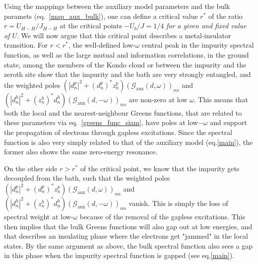 \documentclass{report}
\numberwithin{equation}{section}
\begin{document}
\begin{itemize}
Using the mappings between the auxiliary model parameters and the bulk paramets (eq.~\ref{map_aux_bulk}), one can define a critical value \(r^{*}\) of the ratio \(r = U_{H-H}/J_{H-H}\) at the critical points \(-U_b/J=1/4\) \textit{for a given and fixed value of \(U\)}. We will now argue that this critical point describes a metal-insulator transition. For \(r < r^{*}\), the well-defined low-\(\omega\) central peak in the impurity spectral function, as well as the large mutual and information correlations, in the ground state, among the members of the Kondo cloud or between the impurity and the zeroth site show that the impurity and the bath are very strongly entangled, and the weighted poles \(\left(|d^p_n|^2 + \left(d^p_n\right)^* z^p_n\right) \left(\mathcal{G}_\text{aux}(d, \omega)\right)_{nn}\) and \(\left(|d^h_n|^2 + \left(z^h_n\right)^* d^h_n\right)\left(\mathcal{G}_\text{aux}(d, -\omega)\right)_{nn}\) are non-zero at low \(\omega\). This means that both the local and the nearest-neighbour Greens functions, that are related to these parameters via eq.~\ref{greens_func_siam}, have poles at low\(-\omega\) and support the propagation of electrons through gapless excitations. Since the spectral function is also very simply related to that of the auxiliary model (eq.\eqref{main}), the former also shows the same zero-energy resonance.

On the other side \(r > r^{*}\) of the critical point, we know that the impurity gets decoupled from the bath, such that the weighted poles \(\left(|d^p_n|^2 + \left(d^p_n\right)^* z^p_n\right) \left(\mathcal{G}_\text{aux}(d, \omega)\right)_{nn}\) and \(\left(|d^h_n|^2 + \left(z^h_n\right)^* d^h_n\right)\left(\mathcal{G}_\text{aux}(d, -\omega)\right)_{nn}\) vanish. This is simply the loss of spectral weight at low-\(\omega\) because of the removal of the gapless excitations. This then implies that the bulk Greens functions will also gap out at low energies, and that describes an insulating phase where the electrons get "jammed" in the local states. By the same argument as above, the bulk spectral function also sees a gap in this phase when the impurity spectral function is gapped (see eq.\eqref{main}).


\end{itemize}
\end{document}
